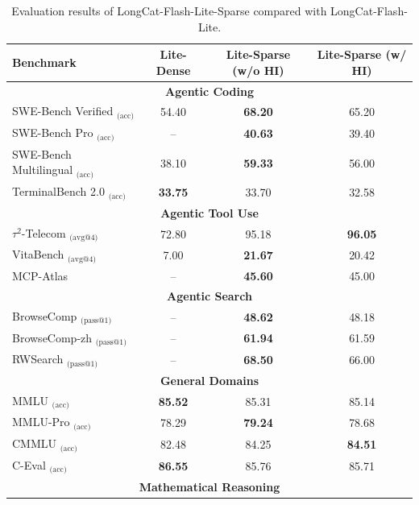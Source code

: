 \documentclass{article}
\newcommand{\longcat}{LongCat-Flash-Lite\xspace}
\begin{document}
\begin{table}[htbp]
\centering
\caption{Evaluation results of LongCat-Flash-Lite-Sparse compared with \longcat.}
\label{tab:release_model_eval}
\small
\setlength{\tabcolsep}{8pt}
\begin{tabular}{l|c|cc}
\toprule
\textbf{Benchmark} & \textbf{Lite-Dense} & \textbf{Lite-Sparse (w/o HI)} & \textbf{Lite-Sparse (w/ HI)} \\
\midrule
\multicolumn{4}{c}{\textbf{Agentic Coding}} \\
\midrule
SWE-Bench Verified $_{\text{(acc)}}$          & 54.40 & \textbf{68.20} & 65.20 \\
SWE-Bench Pro $_{\text{(acc)}}$               & -- & \textbf{40.63} & 39.40 \\
SWE-Bench Multilingual $_{\text{(acc)}}$      & 38.10 & \textbf{59.33} & 56.00 \\
TerminalBench 2.0 $_{\text{(acc)}}$           & \textbf{33.75} & 33.70 & 32.58 \\
\midrule
\multicolumn{4}{c}{\textbf{Agentic Tool Use}} \\
\midrule
$\tau^2$-Telecom $_{\text{(avg@4)}}$  & 72.80 & 95.18 & \textbf{96.05} \\
VitaBench $_{\text{(avg@4)}}$                 & 7.00 & \textbf{21.67} & 20.42 \\
MCP-Atlas                                      & -- & \textbf{45.60} & 45.00 \\
\midrule
\multicolumn{4}{c}{\textbf{Agentic Search}} \\
\midrule
BrowseComp $_{\text{(pass@1)}}$               & -- & \textbf{48.62} & 48.18 \\
BrowseComp-zh $_{\text{(pass@1)}}$            & -- & \textbf{61.94} & 61.59 \\
RWSearch $_{\text{(pass@1)}}$                 & -- & \textbf{68.50} & 66.00 \\
\midrule
\multicolumn{4}{c}{\textbf{General Domains}} \\
\midrule
MMLU $_{\text{(acc)}}$           & \textbf{85.52} & 85.31 & 85.14 \\
MMLU-Pro $_{\text{(acc)}}$      & 78.29 & \textbf{79.24} & 78.68 \\
CMMLU $_{\text{(acc)}}$         & 82.48 & 84.25 & \textbf{84.51} \\
C-Eval $_{\text{(acc)}}$        & \textbf{86.55} & 85.76 & 85.71 \\
\midrule
\multicolumn{4}{c}{\textbf{Mathematical Reasoning}} \\
\midrule

\end{tabular}
\end{table}
\end{document}
